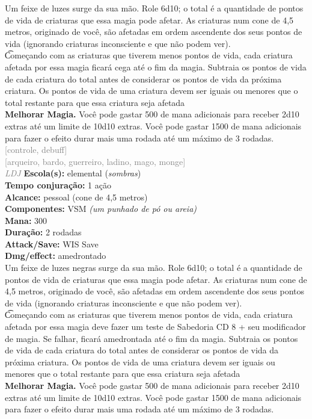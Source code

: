 \documentclass{RPG_Adventure}[2021/10/20]
\begin{document}
{\normalsize Um feixe de luzes surge da sua mão. Role 6d10; o total é a quantidade de pontos de vida de criaturas que essa magia pode afetar. As criaturas num cone de 4,5 metros, originado de você, são afetadas em ordem ascendente dos seus pontos de vida (ignorando criaturas inconsciente e que não podem ver).\\\t Começando com as criaturas que tiverem menos pontos de vida, cada criatura afetada por essa magia ficará cega até o fim da magia. Subtraia os pontos de vida de cada criatura do total antes de considerar os pontos de vida da próxima criatura. Os pontos de vida de uma criatura devem ser iguais ou menores que o total restante para que essa criatura seja afetada\\\t \textbf{Melhorar Magia.} Você pode gastar 500 de mana adicionais para receber 2d10 extras até um limite de 10d10 extras. Você pode gastar 1500 de mana adicionais para fazer o efeito durar mais uma rodada até um máximo de 3 rodadas.\\}
{\scriptsize \textcolor{gray}{[controle, debuff]\\}}
{\scriptsize \textcolor{gray}{[arqueiro, bardo, guerreiro, ladino, mago, monge]\\}}
{\tiny \textcolor{gray}{\textit{LDJ}}}
{\small \t \textbf{Escola(s):} elemental (\textit{sombras})\\\t \textbf{Tempo conjuração:} 1 ação\\\t \textbf{Alcance:} pessoal (cone de 4,5 metros)\\\t \textbf{Componentes:} VSM \textit{(um punhado de pó ou areia)}\\\t \textbf{Mana:} 300\\\t \textbf{Duração:} 2 rodadas\\\t \textbf{Attack/Save:} WIS Save\\\t \textbf{Dmg/effect:} amedrontado\\}
{\normalsize Um feixe de luzes negras surge da sua mão. Role 6d10; o total é a quantidade de pontos de vida de criaturas que essa magia pode afetar. As criaturas num cone de 4,5 metros, originado de você, são afetadas em ordem ascendente dos seus pontos de vida (ignorando criaturas inconsciente e que não podem ver).\\\t Começando com as criaturas que tiverem menos pontos de vida, cada criatura afetada por essa magia deve fazer um teste de Sabedoria CD 8 + seu modificador de magia. Se falhar, ficará amedrontada até o fim da magia. Subtraia os pontos de vida de cada criatura do total antes de considerar os pontos de vida da próxima criatura. Os pontos de vida de uma criatura devem ser iguais ou menores que o total restante para que essa criatura seja afetada\\\t \textbf{Melhorar Magia.} Você pode gastar 500 de mana adicionais para receber 2d10 extras até um limite de 10d10 extras. Você pode gastar 1500 de mana adicionais para fazer o efeito durar mais uma rodada até um máximo de 3 rodadas.\\}
\end{document}

